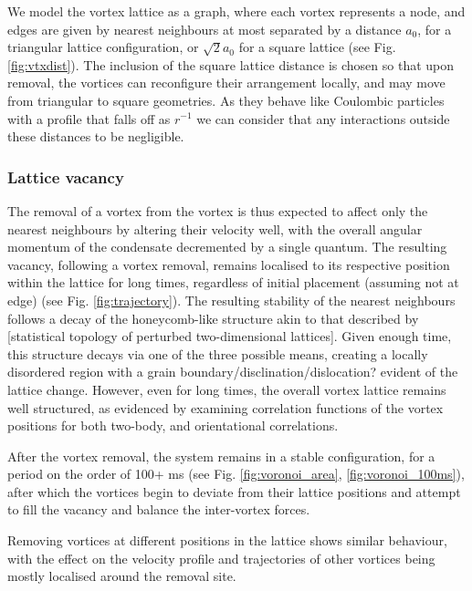 We model the vortex lattice as a graph, where each vortex represents a node, and edges are given by nearest neighbours at most separated by
a distance $a_0$, for a triangular lattice configuration, or $\sqrt{2}a_0$ for a square lattice (see Fig. \ref{fig:vtxdist}). The inclusion
of the square lattice distance is chosen so that upon removal, the vortices can reconfigure their arrangement locally, and may move from
triangular to square geometries. As they behave like Coulombic particles with a profile that falls off as $r^{-1}$ we can consider that any
interactions outside these distances to be negligible.

\subsubsection{Lattice vacancy}
The removal of a vortex from the vortex is thus expected to affect only the nearest neighbours by altering their velocity well, with the
overall angular momentum of the condensate decremented by a single quantum. The resulting vacancy, following a vortex removal, remains
localised to its respective position within the lattice for long times, regardless of initial placement (assuming not at edge)
(see Fig. \ref{fig:trajectory}). The
resulting stability of the nearest neighbours follows a decay of the honeycomb-like structure akin to that described by [statistical
topology of perturbed two-dimensional lattices]. Given enough time, this structure decays via one of the three possible means, creating a
locally disordered region with a grain boundary/disclination/dislocation? evident of the lattice change. However, even for long times, the
overall vortex lattice remains well structured, as evidenced by examining correlation functions of the vortex positions for both two-body,
and orientational correlations.


\iffalse

\fi

After the vortex removal, the system remains in a stable configuration, for a period on the order of 100+ ms (see Fig. \ref{fig:voronoi_area},
\ref{fig:voronoi_100ms}), after which the vortices begin to deviate from their lattice positions and attempt to fill the vacancy and balance
the inter-vortex forces.
\iffalse
\begin{figure}[tb]
	\texttt{[image: imgs/Disloc\_-1\_centre\_avgarea]}
	\caption{Voronoi cell average area after removing vortex at condensate centre. }
	\label{fig:voronoi_area}
\end{figure}
\fi
Removing vortices at different positions in the lattice shows similar behaviour, with the effect on the velocity profile and trajectories of
other vortices being mostly localised around the removal site.

